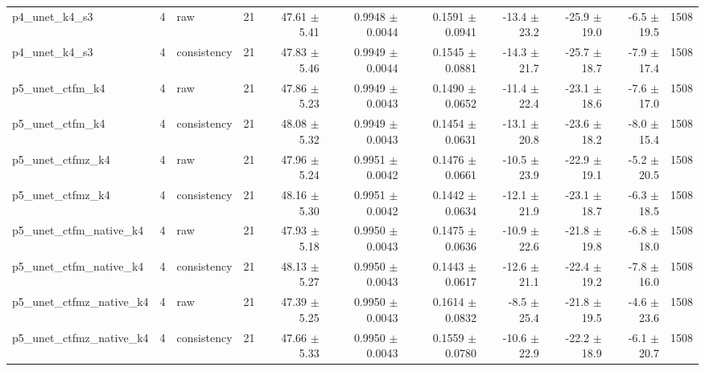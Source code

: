 \begin{tabular}{lllrrrrrrrr}
p4\_unet\_k4\_s3 & 4 & raw & 21 & 47.61 $\pm$ 5.41 & 0.9948 $\pm$ 0.0044 & 0.1591 $\pm$ 0.0941 & -13.4 $\pm$ 23.2 & -25.9 $\pm$ 19.0 & -6.5 $\pm$ 19.5 & 1508 \\
p4\_unet\_k4\_s3 & 4 & consistency & 21 & 47.83 $\pm$ 5.46 & 0.9949 $\pm$ 0.0044 & 0.1545 $\pm$ 0.0881 & -14.3 $\pm$ 21.7 & -25.7 $\pm$ 18.7 & -7.9 $\pm$ 17.4 & 1508 \\
p5\_unet\_ctfm\_k4 & 4 & raw & 21 & 47.86 $\pm$ 5.23 & 0.9949 $\pm$ 0.0043 & 0.1490 $\pm$ 0.0652 & -11.4 $\pm$ 22.4 & -23.1 $\pm$ 18.6 & -7.6 $\pm$ 17.0 & 1508 \\
p5\_unet\_ctfm\_k4 & 4 & consistency & 21 & 48.08 $\pm$ 5.32 & 0.9949 $\pm$ 0.0043 & 0.1454 $\pm$ 0.0631 & -13.1 $\pm$ 20.8 & -23.6 $\pm$ 18.2 & -8.0 $\pm$ 15.4 & 1508 \\
p5\_unet\_ctfmz\_k4 & 4 & raw & 21 & 47.96 $\pm$ 5.24 & 0.9951 $\pm$ 0.0042 & 0.1476 $\pm$ 0.0661 & -10.5 $\pm$ 23.9 & -22.9 $\pm$ 19.1 & -5.2 $\pm$ 20.5 & 1508 \\
p5\_unet\_ctfmz\_k4 & 4 & consistency & 21 & 48.16 $\pm$ 5.30 & 0.9951 $\pm$ 0.0042 & 0.1442 $\pm$ 0.0634 & -12.1 $\pm$ 21.9 & -23.1 $\pm$ 18.7 & -6.3 $\pm$ 18.5 & 1508 \\
p5\_unet\_ctfm\_native\_k4 & 4 & raw & 21 & 47.93 $\pm$ 5.18 & 0.9950 $\pm$ 0.0043 & 0.1475 $\pm$ 0.0636 & -10.9 $\pm$ 22.6 & -21.8 $\pm$ 19.8 & -6.8 $\pm$ 18.0 & 1508 \\
p5\_unet\_ctfm\_native\_k4 & 4 & consistency & 21 & 48.13 $\pm$ 5.27 & 0.9950 $\pm$ 0.0043 & 0.1443 $\pm$ 0.0617 & -12.6 $\pm$ 21.1 & -22.4 $\pm$ 19.2 & -7.8 $\pm$ 16.0 & 1508 \\
p5\_unet\_ctfmz\_native\_k4 & 4 & raw & 21 & 47.39 $\pm$ 5.25 & 0.9950 $\pm$ 0.0043 & 0.1614 $\pm$ 0.0832 & -8.5 $\pm$ 25.4 & -21.8 $\pm$ 19.5 & -4.6 $\pm$ 23.6 & 1508 \\
p5\_unet\_ctfmz\_native\_k4 & 4 & consistency & 21 & 47.66 $\pm$ 5.33 & 0.9950 $\pm$ 0.0043 & 0.1559 $\pm$ 0.0780 & -10.6 $\pm$ 22.9 & -22.2 $\pm$ 18.9 & -6.1 $\pm$ 20.7 & 1508 \\
\bottomrule
\end{tabular}
